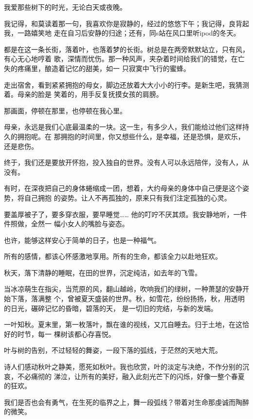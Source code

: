 		我爱那些树下的时光，无论白天或夜晚。

		我记得，和莫读着那一句，我喜欢你是寂静的，经过的悠悠下午；我记得，良背起我，一路嬉笑地
	走在自习后安静的归途；还有，同s站在风口里听ipod的冬天。

		都是在这一条长街，落着叶，也落着梦的长街。树总是在两旁默默站立，只有风，有心无心地哼着
	歌，深情而忧伤。那一种风声，夹杂着时间给我们的错觉，在亡失的疼痛里，酿造着记忆的甜美，如一
	只寂寞中飞行的蜜蜂。

		走出宿舍，看到紧紧拥抱的母女，脚边还放着大大小小的行李。是新生吧，我猜测着。母亲的脸是
	笑着的，用手反复抚摸女孩的肩膀。

		那画面，停顿在那里，也停顿在我心里。

		母亲，永远是我们心底最温柔的一块。这一生，有多少人，我们能给过他们这样持久的拥抱呢。在
	那拥抱的时间里，你又想些什么，是幸福，还是恐惧，是欢乐，还是悲伤。

		终于，我们还是要放开怀抱，投入独自的世界。没有人可以永远陪伴，没有人，从没有。

		有时，在深夜把自己的身体蜷缩成一团，想着，大约母亲的身体中自己便是这个姿势，将自己拥抱
	的姿势。让人不再孤独的，原来只有我们注定孤独的心灵。

		要盖厚被子了，要多穿衣服，要早睡觉…… 他的叮咛不厌其烦。我安静地听，一件件照做，全然一
	幅小女人的嘴脸与姿态。

		也许，能够这样安心于简单的日子，也是一种福气。

		所有的感情，都该心怀感激地享用。所有的生命，都该全力以赴地狂欢。

		秋天，落下清静的睡眠，在田的世界，沉定纯洁，如去年的飞雪。

	\endwriting



		当冰凉萌生在指尖，当荒原的风，翻山越岭，吹响我们的绿树，一种萧瑟的安静开始下落，落满整
	个，曾被夏天盛装的世界。秋，如雪花，纷纷扬扬，秋，用透明的日光，碾碎记忆的昏暗，碧落的天，
	是一切旧的完结，与新的发端。

		一叶知秋。夏末里，第一枚落叶，飘在谁的视线，又兀自睡去。归于土地，在这恰好的时节，每一
	棵树该都心存喜悦。

		叶与树的告别，不过轻轻的舞姿，一段下落的弧线，于茫然的天地大荒。

		诗人们感动秋叶之静美，愿死如秋叶。我也欣赏，叶的淡定与决绝，不作分别的沉哀，不必痛彻的
	涕泣，让所有的美好，融入此刻光芒下的闪烁，好像一整个春夏的狂欢。

		我们是否也会有勇气，在生死的临界之上，舞一段弧线？带着对生命那虔诚而陶醉的微笑。

